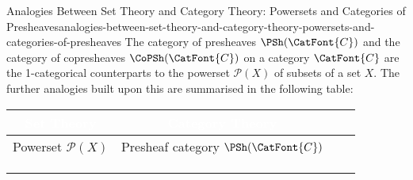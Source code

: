\begin{remark}{Analogies Between Set Theory and Category Theory: Powersets and Categories of Presheaves}{analogies-between-set-theory-and-category-theory-powersets-and-categories-of-presheaves}%
    The category of presheaves $\PSh(\CatFont{C})$ and the category of copresheaves $\CoPSh(\CatFont{C})$ on a category $\CatFont{C}$ are the 1-categorical counterparts to the powerset $\mathcal{P}(X)$ of subsets of a set $X$. The further analogies built upon this are summarised in the following table:
    \begingroup%
    \setlength\cellspacetoplimit{3pt}
    \setlength\cellspacebottomlimit{3pt}
    \renewcommand{\arraystretch}{1.2}
    \begin{center}
        \begin{tabular}{|Sc|Sc|}\hline{}
            \textcolor{white}{\textbf{Set Theory}}                                                                                                                                    & \textcolor{white}{\textbf{Category Theory}}                                                                                                   \\\hline{}
            Powerset $\mathcal{P}(X)$                                                                                                                                                          & Presheaf category $\PSh(\CatFont{C})$                                                                                                         \\
                                                                                                                                                         &                                                                                                                 \\
                                                                                        &                                                     \\

\end{tabular}
\end{center}
\end{remark}
